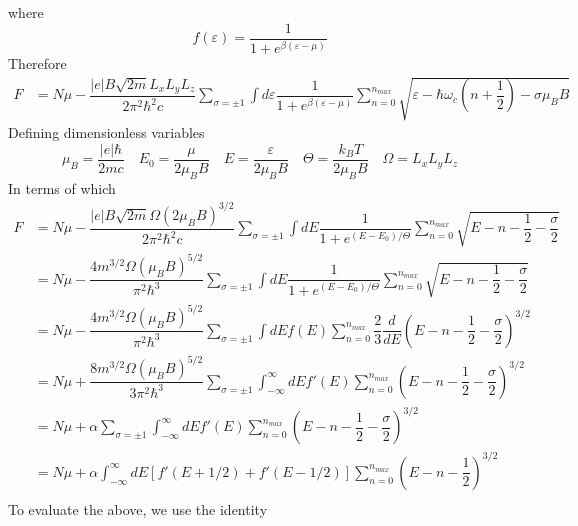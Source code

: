 \documentclass[aps,prb,onecolumn,notitlepage,showpacs,floatfix,superscriptaddress]{revtex4-1}
\begin{document}
where 
\begin{equation}
f(\varepsilon) = \dfrac{1}{1+e^{\beta(\varepsilon - \mu)}}
\end{equation}
Therefore
\begin{equation}
\begin{split}
F &= N\mu - \dfrac{|e| B \sqrt{2m} L_x L_y L_z }{2 \pi^2 \hbar^2 c}  \sum_{\sigma=\pm 1} \int d\varepsilon \dfrac{1}{1+e^{\beta(\varepsilon - \mu)}} \sum_{n=0}^{n_{max}} \sqrt{\varepsilon - \hbar \omega_c \left(n+\dfrac{1}{2}\right)-\sigma \mu_B B}
\end{split}
\end{equation}
Defining dimensionless variables
\begin{equation}
\mu_B = \dfrac{|e| \hbar	}{2 m c} \quad E_0 = \dfrac{\mu}{2 \mu_B B} \quad E = \dfrac{\varepsilon}{2 \mu_B B} \quad \Theta = \dfrac{k_B T}{2 \mu_B B} \quad \Omega = L_x L_y L_z
\end{equation}
In terms of which
\begin{equation}
\begin{split}
F &= N\mu - \dfrac{|e| B \sqrt{2m} \Omega (2 \mu_B B)^{3/2}}{2 \pi^2 \hbar^2 c}  \sum_{\sigma=\pm 1} \int dE \dfrac{1}{1+e^{(E-E_0)/\Theta}} \sum_{n=0}^{n_{max}} \sqrt{E - n - \dfrac{1}{2}-\dfrac{\sigma}{2}} \\
&= N\mu - \dfrac{ 4 m^{3/2} \Omega (\mu_B B)^{5/2}}{ \pi^2 \hbar^3 }  \sum_{\sigma=\pm 1} \int dE \dfrac{1}{1+e^{(E-E_0)/\Theta}} \sum_{n=0}^{n_{max}} \sqrt{E - n - \dfrac{1}{2}-\dfrac{\sigma}{2}} \\
&= N\mu - \dfrac{ 4 m^{3/2} \Omega (\mu_B B)^{5/2}}{ \pi^2 \hbar^3 }  \sum_{\sigma=\pm 1} \int dE f(E) \sum_{n=0}^{n_{max}} \dfrac{2}{3}\dfrac{d}{dE} \left(E - n - \dfrac{1}{2}-\dfrac{\sigma}{2}\right)^{3/2} \\
&= N\mu + \dfrac{ 8 m^{3/2} \Omega (\mu_B B)^{5/2}}{ 3 \pi^2 \hbar^3 }  \sum_{\sigma=\pm 1} \int_{-\infty}^\infty dE f'(E) \sum_{n=0}^{n_{max}}  \left(E - n - \dfrac{1}{2}-\dfrac{\sigma}{2}\right)^{3/2} \\
&= N\mu + \alpha \sum_{\sigma=\pm 1} \int_{-\infty}^\infty dE f'(E) \sum_{n=0}^{n_{max}}  \left(E - n - \dfrac{1}{2}-\dfrac{\sigma}{2}\right)^{3/2} \\
&= N\mu + \alpha \int_{-\infty}^\infty dE \left[ f'(E + 1/2) + f'(E-1/2) \right] \sum_{n=0}^{n_{max}}  \left(E - n - \dfrac{1}{2}\right)^{3/2} \\
\end{split}
\end{equation}
To evaluate the above, we use the identity
\end{document}
